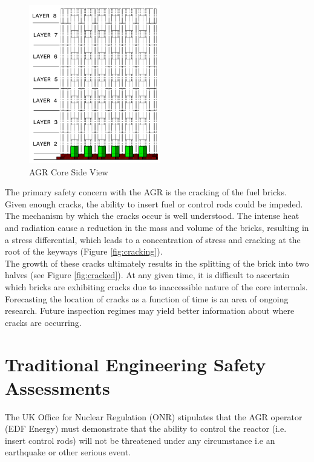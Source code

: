 \begin{figure}[ht!]
	\centering
	\includegraphics[scale=0.75]{Figures/AGR_side}
	\caption{AGR Core Side View}
	\label{fig:side}
\end{figure}

\noindent
The primary safety concern with the AGR is the cracking of the fuel bricks. Given enough cracks, the ability to insert fuel or control rods could be impeded. The mechanism by which the cracks occur is well understood. The intense heat and radiation cause a reduction in the mass and volume of the bricks, resulting in a stress differential, which leads to a concentration of stress and cracking at the root of the keyways (Figure \ref{fig:cracking}). \\ 

\noindent
The growth of these cracks ultimately results in the splitting of the brick into two halves (see Figure \ref{fig:cracked}). At any given time, it is difficult to ascertain which bricks are exhibiting cracks due to inaccessible nature of the core internals. Forecasting the location of cracks as a function of time is an area of ongoing research. Future inspection regimes may yield better information about where cracks are occurring.

\section{Traditional Engineering Safety Assessments} \label{Engineering}
The UK Office for Nuclear Regulation (ONR) stipulates that the AGR operator (EDF Energy) must demonstrate that the ability to control the reactor (i.e. insert control rods) will not be threatened under any circumstance i.e an earthquake or other serious event.\\

